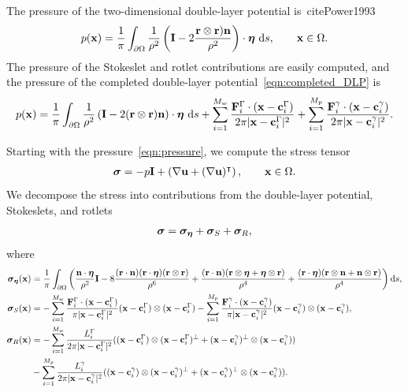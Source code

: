 \documentclass[preprint, 10pt]{elsarticle}
\begin{document}
The pressure of the two-dimensional double-layer potential
is~cite{Power1993}
\begin{align*}
  p({\mathbf{x}}) = \frac{1}{\pi}\int_{\partial\Omega}\frac{1}{\rho^2}\left(
\mathbf{I} - 2\frac{{\mathbf{r}} \otimes {\mathbf{r}}){\mathbf{n}}}{\rho^2}\right)\cdot{\boldsymbol\eta}~\text{d}s,
\qquad{\mathbf{x}}\in\Omega.
\end{align*}
The pressure of the Stokeslet and rotlet contributions are easily
computed, and the pressure of the completed double-layer
potential~\eqref{eqn:completed_DLP} is
\begin{align}
  \label{eqn:pressure} 
  p({\mathbf{x}}) = \frac{1}{\pi}\int_{\partial\Omega}\frac{1}{\rho^2}\left(
    \mathbf{I} - 2({\mathbf{r}} \otimes {\mathbf{r}}){\mathbf{n}}\right)\cdot{\boldsymbol\eta}~\text{d}s +
  \sum_{i=1}^{M_w}
  \frac{{\mathbf{F}}_i^\Gamma\cdot({\mathbf{x}}-{\mathbf{c}}_i^\Gamma)}{2\pi|{\mathbf{x}}-{\mathbf{c}}_i^{\Gamma}|^2}
  + \sum_{i=1}^{M_p}
    \frac{{\mathbf{F}}_i^\gamma\cdot({\mathbf{x}}-{\mathbf{c}}_i^\gamma)}{2\pi|{\mathbf{x}}-{\mathbf{c}}_i^\gamma|^2}.
\end{align}

Starting with the pressure~\eqref{eqn:pressure}, we compute the stress
tensor
\begin{align*} 
{\boldsymbol\sigma} = -p \mathbf{I} + \left(\nabla {\mathbf{u}} + (\nabla{\mathbf{u}})^\intercal\right), \qquad
{\mathbf{x}}\in\Omega.
\end{align*}
We decompose the stress into contributions from the double-layer
potential, Stokeslets, and rotlets
\begin{align}
  \label{eqn:stress}
  {\boldsymbol\sigma} = {\boldsymbol\sigma}_{{\boldsymbol\eta}} + {\boldsymbol\sigma}_{S} + {\boldsymbol\sigma}_{R},
\end{align}
where
\begin{align*}
  {\boldsymbol\sigma}_{{\boldsymbol\eta}}({\mathbf{x}}) &= \frac{1}{\pi}\int_{\partial\Omega}\left( 
    \frac{{\mathbf{n}}\cdot{\boldsymbol\eta}}{\rho^2}\mathbf{I} 
    -8\frac{({\mathbf{r}}\cdot{\mathbf{n}})({\mathbf{r}}\cdot{\boldsymbol\eta})({\mathbf{r}}\otimes{\mathbf{r}})}{\rho^6} 
    +\frac{({\mathbf{r}}\cdot{\mathbf{n}})({\mathbf{r}}\otimes{\boldsymbol\eta} + {\boldsymbol\eta}\otimes{\mathbf{r}})}{\rho^4} 
+ \frac{({\mathbf{r}}\cdot{\boldsymbol\eta})({\mathbf{r}}\otimes{\mathbf{n}} +
{\mathbf{n}}\otimes{\mathbf{r}})}{\rho^4}\right)\text{d}s,\\
  {\boldsymbol\sigma}_S({\mathbf{x}}) &= -\sum_{i=1}^{M_w} 
    \frac{{\mathbf{F}}_i^\Gamma\cdot({\mathbf{x}} - {\mathbf{c}}_i^\Gamma)}{\pi|{\mathbf{x}}-{\mathbf{c}}_i^\Gamma|^2}
        ({\mathbf{x}} - {\mathbf{c}}_i^\Gamma)\otimes({\mathbf{x}} - {\mathbf{c}}_i^\Gamma)  -
    \sum_{i=1}^{M_p}
    \frac{{\mathbf{F}}_i^\gamma\cdot({\mathbf{x}} - {\mathbf{c}}_i^\gamma)}{\pi|{\mathbf{x}}-{\mathbf{c}}_i^\gamma|^2}
        ({\mathbf{x}}-{\mathbf{c}}_i^\gamma )\otimes({\mathbf{x}}-{\mathbf{c}}_i^\gamma),\\
{\boldsymbol\sigma}_R({\mathbf{x}}) &= -\sum_{i=1}^{M_w} \frac{L_i^\Gamma}{2\pi|{\mathbf{x}}-{\mathbf{c}}_i^\Gamma|^2}
(({\mathbf{x}}-{\mathbf{c}}_i^\Gamma)\otimes({\mathbf{x}}-{\mathbf{c}}_i^\Gamma)^\perp +
    ({\mathbf{x}}-{\mathbf{c}}_i^\gamma)^\perp\otimes({\mathbf{x}}-{\mathbf{c}}_i^\gamma))  \\
\qquad&-\sum_{i=1}^{M_p}
\frac{L_i^\gamma}{2\pi|{\mathbf{x}}-{\mathbf{c}}_i^\gamma|^2}
    (({\mathbf{x}}-{\mathbf{c}}_i^\gamma )\otimes({\mathbf{x}}-{\mathbf{c}}_i^\gamma)^\perp + 
    ({\mathbf{x}}-{\mathbf{c}}_i^\gamma)^\perp\otimes({\mathbf{x}}-{\mathbf{c}}_i^\gamma)).
\end{align*}
\end{document}
